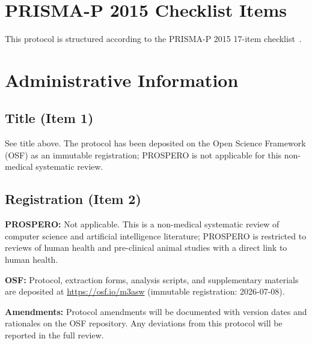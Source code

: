 \section*{PRISMA-P 2015 Checklist Items}

This protocol is structured according to the PRISMA-P 2015 17-item checklist~\cite{shamseer2015prismap}.

\section{Administrative Information}

\subsection{Title (Item 1)}

See title above. The protocol has been deposited on the Open Science Framework (OSF) as an immutable registration; PROSPERO is not applicable for this non-medical systematic review.

\subsection{Registration (Item 2)}

\textbf{PROSPERO:} Not applicable. This is a non-medical systematic review of computer science and artificial intelligence literature; PROSPERO is restricted to reviews of human health and pre-clinical animal studies with a direct link to human health.

\textbf{OSF:} Protocol, extraction forms, analysis scripts, and supplementary materials are deposited at \url{https://osf.io/m3asw} (immutable registration: 2026-07-08).

\textbf{Amendments:} Protocol amendments will be documented with version dates and rationales on the OSF repository. Any deviations from this protocol will be reported in the full review.

